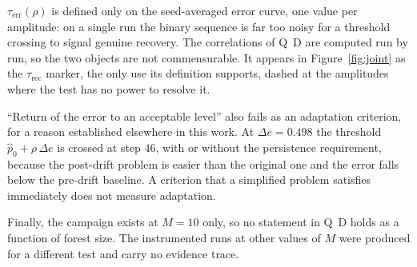 \documentclass[11pt,a4paper]{article}
\begin{document}
$\tau_{\mathrm{err}}(\rho)$ is defined only on the seed-averaged error curve, one value per
amplitude: on a single run the binary sequence is far too noisy for a threshold crossing to
signal genuine recovery. The correlations of Q~D are computed run by run, so the two
objects are not commensurable. It appears in Figure~\ref{fig:joint} as the
$\tau_{\mathrm{rec}}$ marker, the only use its definition supports, dashed at the
amplitudes where the test has no power to resolve it.

``Return of the error to an acceptable level'' also fails as an adaptation criterion, for a
reason established elsewhere in this work. At $\Delta e = 0.498$ the threshold
$\hat p_0 + \rho\,\Delta e$ is crossed at step $46$, with or without the persistence
requirement, because the post-drift problem is easier than the original one and the error
falls below the pre-drift baseline. A criterion that a simplified problem satisfies
immediately does not measure adaptation.

Finally, the campaign exists at $M = 10$ only, so no statement in Q~D holds as a function
of forest size. The instrumented runs at other values of $M$ were produced for a different
test and carry no evidence trace.
\end{document}
